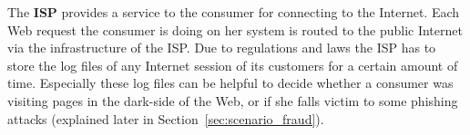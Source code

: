 The \textbf{ISP} provides a service to the consumer for connecting to the Internet. Each Web request the consumer is doing on her system is routed to the public Internet via the infrastructure of the \gls{ISP}. Due to regulations and laws the \gls{ISP} has to store the log files of any Internet session of its customers for a certain amount of time. Especially these log files can be helpful to decide whether a consumer was visiting pages in the dark-side of the Web, or if she falls victim to some phishing attacks (explained later in Section~\ref{sec:scenario_fraud}).


